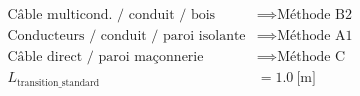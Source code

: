 \documentclass[a4paper,11pt,answers,addpoints]{exam}
\begin{document}
\begin{questions}
\begin{solution}
	\begin{align*}
		\text{Câble multicond. / conduit / bois} &\implies \text{Méthode B2} \\[6pt]
		\text{Conducteurs / conduit / paroi isolante} &\implies \text{Méthode A1} \\[6pt]
		\text{Câble direct / paroi maçonnerie} &\implies \text{Méthode C} \\[6pt]
		L_{\text{transition\_standard}} &= \qty{1,0}{[\metre]}
	\end{align*}
\end{solution}
\end{questions}
\end{document}
